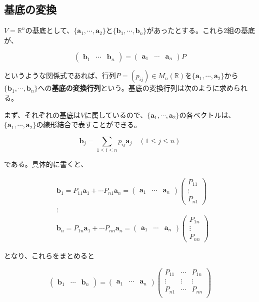 \documentclass[dvipdfmx,autodetect-engine]{jsarticle}
\newcommand{\vecSpace}[1]{\mathbb{R}^{#1}}
\begin{document}
\subsection{基底の変換}

$V = \vecSpace{n}$の基底として、$\{\bm{a}_1, \cdots, \bm{a}_2\}$と$\{\bm{b}_1, \cdots, \bm{b}_n\}$があったとする。これら2組の基底が、

$$
\begin{pmatrix}
\bm{b}_1 & \cdots & \bm{b}_n
\end{pmatrix} =
\begin{pmatrix}
\bm{a}_1 & \cdots & \bm{a}_n
\end{pmatrix}P
$$

というような関係式であれば、行列$P = (p_{ij}) \in M_n(\mathbb{R})$を$\{\bm{a}_1, \cdots, \bm{a}_2\}$から$\{\bm{b}_1, \cdots, \bm{b}_n\}$への{\bf 基底の変換行列}という。基底の変換行列は次のように求められる。

まず、それぞれの基底は$V$に属しているので、$\{\bm{a}_1, \cdots, \bm{a}_2\}$の各ベクトルは、$\{\bm{a}_1, \cdots, \bm{a}_2\}$の線形結合で表すことができる。

$$
\bm{b}_j = \sum_{1 \leq i \leq n} p_{ij}\bm{a}_j \quad (1 \leq j \leq n)
$$

である。具体的に書くと、

\begin{eqnarray*}
&\bm{b}_1 = P_{11}\bm{a}_1 + \cdots P_{n1}\bm{a}_n = 
\begin{pmatrix}
\bm{a}_1 & \cdots & \bm{a}_n
\end{pmatrix}
\begin{pmatrix}
P_{11} \\
\vdots \\
P_{n1}
\end{pmatrix} \\
&\vdots \\
&\bm{b}_n = P_{1n}\bm{a}_1 + \cdots P_{nn}\bm{a}_n = 
\begin{pmatrix}
\bm{a}_1 & \cdots & \bm{a}_n
\end{pmatrix}
\begin{pmatrix}
P_{1n} \\
\vdots \\
P_{nn}
\end{pmatrix}
\end{eqnarray*}

となり、これらをまとめると

$$
\begin{pmatrix}
\bm{b}_1 & \cdots & \bm{b}_n
\end{pmatrix} = 
\begin{pmatrix}
\bm{a}_1 & \cdots & \bm{a}_n
\end{pmatrix}
\begin{pmatrix}
P_{11} & \cdots & P_{1n} \\
\vdots & \vdots & \vdots \\
P_{n1} & \cdots & P_{nn} \\
\end{pmatrix}
$$
\end{document}
